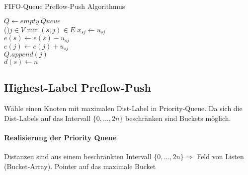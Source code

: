 \begin{algorithm}
 \caption{FIFO-Queue Preflow-Push Algorithmus}
 $Q\gets empty\ Queue$\\
 \For(){$j\in V$ mit $(s,j) \in E$}{
    $x_{sj}\gets u_{sj}$\\
    $e(s)\gets e(s) - u_{sj}$\\
    $e(j)\gets e(j) + u_{sj}$\\
    $Q.append(j)$\\
 }
 $d(s) \gets n$\\
 
 
 
 
 
\end{algorithm}

\newpage

\subsection{Highest-Label Preflow-Push}
Wähle einen Knoten mit maximalen Dist-Label in Priority-Queue. Da sich die Dist-Labels auf das Intervall $\{0,\dots, 2n \}$ beschränken sind Buckets möglich.
\paragraph{Realisierung der Priority Queue} Distanzen sind aus einem beschränkten Intervall $\{0, \dots,  2n\}\Rightarrow$ Feld von Listen (Bucket-Array). Pointer auf das maximale Bucket
